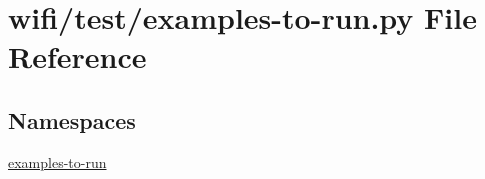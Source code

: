 \hypertarget{wifi_2test_2examples-to-run_8py}{}\section{wifi/test/examples-\/to-\/run.py File Reference}
\label{wifi_2test_2examples-to-run_8py}
\subsection*{Namespaces}
\begin{DoxyCompactItemize}
\item 
 \hyperlink{namespaceexamples-to-run}{examples-\/to-\/run}
\end{DoxyCompactItemize}
